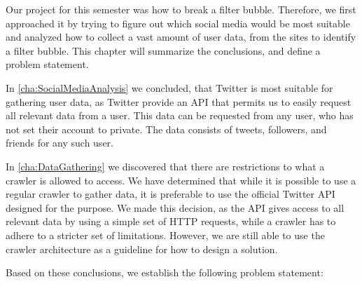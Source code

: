 Our project for this semester was how to break a filter bubble. Therefore, we
first approached it by trying to figure out which social media would be most
suitable and analyzed how to collect a vast amount of user data, from the sites
to identify a filter bubble.
This chapter will summarize the conclusions, and define a problem
statement.\nl

In \autoref{cha:SocialMediaAnalysis} we concluded, that Twitter is most suitable
for gathering user data, as Twitter provide an \ac{API} that permits us to
easily request all relevant data from a user. This data can be requested from
any user, who has not set their account to private. The data consists of tweets,
followers, and friends for any such user.\nl

In \autoref{cha:DataGathering} we discovered that there are restrictions to what
a crawler is allowed to access. We have determined that while it is possible to
use a regular crawler to gather data, it is preferable to use the official
Twitter \ac{API} designed for the purpose. We made this decision, as the
\ac{API} gives access to all relevant data by using a simple set of \ac{HTTP}
requests, while a crawler has to adhere to a stricter set of limitations.
However, we are still able to use the crawler architecture as a guideline for
how to design a solution.\nl


Based on these conclusions, we establish the following problem statement:

\begin{center}
\begin{minipage}{0.95\linewidth} 


\end{minipage}
\end{center}




